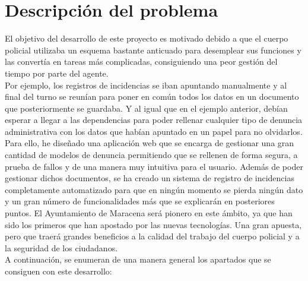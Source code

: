 \chapter{Descripción del problema}

El objetivo del desarrollo de este proyecto es motivado debido a que el cuerpo policial utilizaba un esquema 
bastante anticuado para desemplear sus funciones y las convertía en tareas más complicadas, consiguiendo
una peor gestión del tiempo por parte del agente.\\

Por ejemplo, los registros de incidencias se iban apuntando manualmente y al final del turno se reunían para poner 
en común todos los datos en un documento que posteriormente se guardaba. Y al igual que en el ejemplo anterior, debían 
esperar a llegar a las dependencias para poder rellenar cualquier tipo de denuncia administrativa con los datos que habían
apuntado en un papel para no olvidarlos.\\

Para ello, he diseñado una aplicación web que se encarga de gestionar una gran cantidad de 
modelos de denuncia permitiendo que se rellenen de forma segura, a prueba de 
fallos y de una manera muy intuitiva para el usuario. Además de poder gestionar dichos documentos,
se ha creado un sistema de registro de incidencias completamente automatizado para que en 
ningún momento se pierda ningún dato y un gran número de funcionalidades más que se explicarán en 
posteriores puntos. El Ayuntamiento de Maracena será pionero en este ámbito, ya que han sido los 
primeros que han apostado por las nuevas tecnologías. Una gran apuesta, pero que traerá grandes
beneficios a la calidad del trabajo del cuerpo policial y a la seguridad de los ciudadanos. \\

A continuación, se enumeran de una manera general los apartados que se consiguen con 
este desarrollo:

